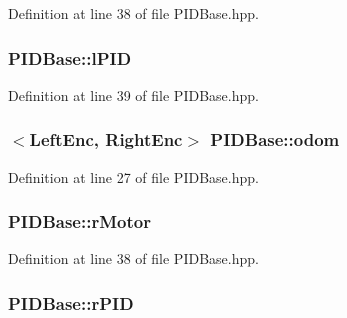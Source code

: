 Definition at line 38 of file P\-I\-D\-Base.\-hpp.

\hypertarget{classPIDBase_a7e39df880dd6279479e77febe800a6ba}{
\subsubsection[{l\-P\-I\-D}]{ P\-I\-D\-Base\-::l\-P\-I\-D\hspace{0.3cm}{\ttfamily [private]}}}\label{classPIDBase_a7e39df880dd6279479e77febe800a6ba}


Definition at line 39 of file P\-I\-D\-Base.\-hpp.

\hypertarget{classPIDBase_a3adee9b84ba975616f672a7620ac16b8}{
\subsubsection[{odom}]{$<${\bf Left\-Enc}, {\bf Right\-Enc}$>$ P\-I\-D\-Base\-::odom}}\label{classPIDBase_a3adee9b84ba975616f672a7620ac16b8}


Definition at line 27 of file P\-I\-D\-Base.\-hpp.

\hypertarget{classPIDBase_ae52cf8a147c90af4334e1ad14f48aa4a}{
\subsubsection[{r\-Motor}]{ P\-I\-D\-Base\-::r\-Motor\hspace{0.3cm}{\ttfamily [private]}}}\label{classPIDBase_ae52cf8a147c90af4334e1ad14f48aa4a}


Definition at line 38 of file P\-I\-D\-Base.\-hpp.

\hypertarget{classPIDBase_a940d3dae6038a472ea613c03c5be3846}{
\subsubsection[{r\-P\-I\-D}]{ P\-I\-D\-Base\-::r\-P\-I\-D\hspace{0.3cm}{\ttfamily [private]}}}\label{classPIDBase_a940d3dae6038a472ea613c03c5be3846}


